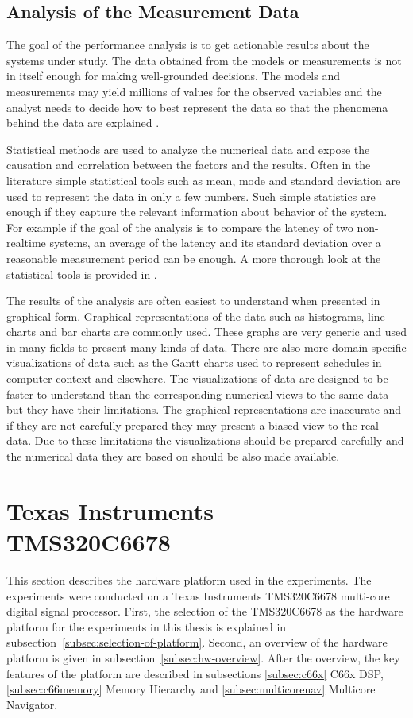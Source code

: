 \subsection{Analysis of the Measurement Data}
\label{subsec:data-analysis}
The goal of the performance analysis is to get actionable results about the systems under study. The data obtained from the models or measurements is not in itself enough for making well-grounded decisions. The models and measurements may yield millions of values for the observed variables and the analyst needs to decide how to best represent the data so that the phenomena behind the data are explained \cite{jain1991art}.

Statistical methods are used to analyze the numerical data and expose the causation and correlation between the factors and the results. Often in the literature simple statistical tools such as mean, mode and standard deviation are used to represent the data in only a few numbers. Such simple statistics are enough if they capture the relevant information about behavior of the system. For example if the goal of the analysis is to compare the latency of two non-realtime systems, an average of the latency and its standard deviation over a reasonable measurement period can be enough. A more thorough look at the statistical tools is provided in \cite{jain1991art}.

The results of the analysis are often easiest to understand when presented in graphical form. Graphical representations of the data such as histograms, line charts and bar charts are commonly used. These graphs are very generic and used in many fields to present many kinds of data. There are also more domain specific visualizations of data such as the Gantt charts used to represent schedules in computer context and elsewhere. The visualizations of data are designed to be faster to understand than the corresponding numerical views to the same data but they have their limitations. The graphical representations are inaccurate and if they are not carefully prepared they may present a biased view to the real data. Due to these limitations the visualizations should be prepared carefully and the numerical data they are based on should be also made available.~\cite{jain1991art}

\section[Texas Instruments TMS320C6678]{Texas Instruments\\TMS320C6678}
\label{sec:c6678}
This section describes the hardware platform used in the experiments. The experiments were conducted on a Texas Instruments TMS320C6678 multi-core digital signal processor. First, the selection of the TMS320C6678 as the hardware platform for the experiments in this thesis is explained in subsection~\ref{subsec:selection-of-platform}. Second, an overview of the hardware platform is given in subsection~\ref{subsec:hw-overview}. After the overview, the key features of the platform are described in subsections \ref{subsec:c66x} C66x DSP, \ref{subsec:c66memory} Memory Hierarchy and \ref{subsec:multicorenav} Multicore Navigator.

